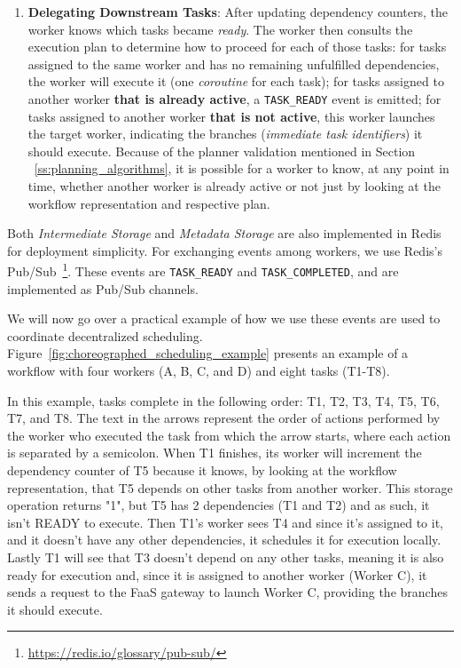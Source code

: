\documentclass[conference]{IEEEtran}
\begin{document}
\begin{enumerate}
    \item \textbf{Delegating Downstream Tasks}: After updating dependency counters, the worker knows which tasks became \textit{ready}. The worker then consults the execution plan to determine how to proceed for each of those tasks: for tasks assigned to the same worker and has no remaining unfulfilled dependencies, the worker will execute it (one \textit{coroutine} for each task); for tasks assigned to another worker \textbf{that is already active}, a \texttt{TASK\_READY} event is emitted; for tasks assigned to another worker \textbf{that is not active}, this worker launches the target worker, indicating the branches (\textit{immediate task identifiers}) it should execute. Because of the planner validation mentioned in Section ~\ref{ss:planning_algorithms}, it is possible for a worker to know, at any point in time, whether another worker is already active or not just by looking at the workflow representation and respective plan.
\end{enumerate}

Both \textit{Intermediate Storage} and \textit{Metadata Storage} are also implemented in Redis for deployment simplicity. For exchanging events among workers, we use Redis's Pub/Sub~\footnote{\url{https://redis.io/glossary/pub-sub/}}. These events are \texttt{TASK\_READY} and \texttt{TASK\_COMPLETED}, and are implemented as Pub/Sub channels. 

We will now go over a practical example of how we use these events are used to coordinate decentralized scheduling. Figure~\ref{fig:choreographed_scheduling_example} presents an example of a workflow with four workers (A, B, C, and D) and eight tasks (T1-T8).

In this example, tasks complete in the following order: T1, T2, T3, T4, T5, T6, T7, and T8. The text in the arrows represent the order of actions performed by the worker who executed the task from which the arrow starts, where each action is separated by a semicolon. When T1 finishes, its worker will increment the dependency counter of T5 because it knows, by looking at the workflow representation, that T5 depends on other tasks from another worker. This storage operation returns "1", but T5 has 2 dependencies (T1 and T2) and as such, it isn't READY to execute. Then T1's worker sees T4 and since it's assigned to it, and it doesn't have any other dependencies, it schedules it for execution locally. Lastly T1 will see that T3 doesn't depend on any other tasks, meaning it is also ready for execution and, since it is assigned to another worker (Worker C), it sends a request to the FaaS gateway to launch Worker C, providing the branches it should execute.
\end{document}
